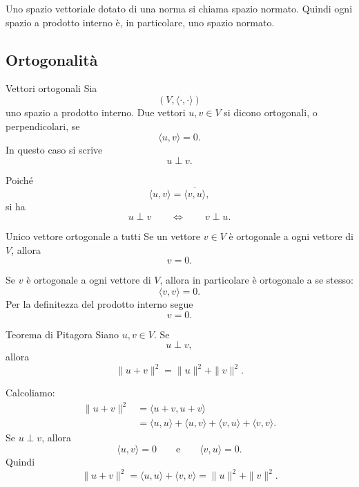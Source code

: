 \documentclass[a4paper]{article}
\begin{document}
Uno spazio vettoriale dotato di una norma si chiama spazio normato. Quindi ogni spazio a prodotto interno è, in particolare, uno spazio normato.

\subsection{Ortogonalità}

\begin{snippetdefinition}{Vettori ortogonali}
    Sia
    \[
        (V,\langle\cdot,\cdot\rangle)
    \]
    uno spazio a prodotto interno. Due vettori \(u,v\in V\) si dicono ortogonali, o perpendicolari, se
    \[
        \langle u,v\rangle=0.
    \]
    In questo caso si scrive
    \[
        u\perp v.
    \]
\end{snippetdefinition}

Poiché
\[
    \langle u,v\rangle=\overline{\langle v,u\rangle},
\]
si ha
\[
    u\perp v
    \qquad
    \Longleftrightarrow
    \qquad
    v\perp u.
\]

\begin{snippetproposition}{Unico vettore ortogonale a tutti}
    Se un vettore \(v\in V\) è ortogonale a ogni vettore di \(V\), allora
    \[
        v=0.
    \]
\end{snippetproposition}

\begin{snippetproof}{}
    Se \(v\) è ortogonale a ogni vettore di \(V\), allora in particolare è ortogonale a se stesso:
    \[
        \langle v,v\rangle=0.
    \]
    Per la definitezza del prodotto interno segue
    \[
        v=0.
    \]
\end{snippetproof}

\begin{snippettheorem}{Teorema di Pitagora}
    Siano \(u,v\in V\). Se
    \[
        u\perp v,
    \]
    allora
    \[
        \|u+v\|^2=\|u\|^2+\|v\|^2.
    \]
\end{snippettheorem}

\begin{snippetproof}{}
    Calcoliamo:
    \begin{align*}
        \|u+v\|^2
        &=
        \langle u+v,u+v\rangle\\
        &=
        \langle u,u\rangle+\langle u,v\rangle+\langle v,u\rangle+\langle v,v\rangle.
    \end{align*}
    Se \(u\perp v\), allora
    \[
        \langle u,v\rangle=0
        \qquad
        \text{e}
        \qquad
        \langle v,u\rangle=0.
    \]
    Quindi
    \[
        \|u+v\|^2
        =
        \langle u,u\rangle+\langle v,v\rangle
        =
        \|u\|^2+\|v\|^2.
    \]
\end{snippetproof}
\end{document}
